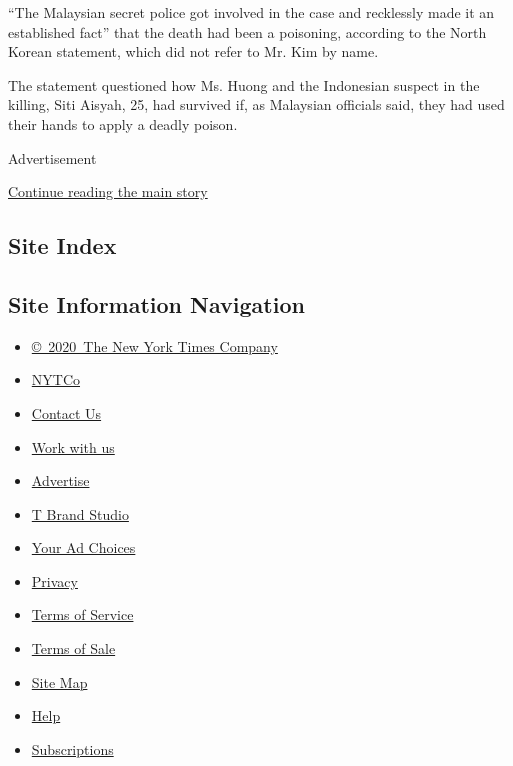 ``The Malaysian secret police got involved in the case and recklessly
made it an established fact'' that the death had been a poisoning,
according to the North Korean statement, which did not refer to Mr. Kim
by name.

The statement questioned how Ms. Huong and the Indonesian suspect in the
killing, Siti Aisyah, 25, had survived if, as Malaysian officials said,
they had used their hands to apply a deadly poison.

Advertisement

\protect\hyperlink{after-bottom}{Continue reading the main story}

\hypertarget{site-index}{%
\subsection{Site Index}\label{site-index}}

\hypertarget{site-information-navigation}{%
\subsection{Site Information
Navigation}\label{site-information-navigation}}

\begin{itemize}
\tightlist
\item
  \href{https://help.nytimes3xbfgragh.onion/hc/en-us/articles/115014792127-Copyright-notice}{©~2020~The
  New York Times Company}
\end{itemize}

\begin{itemize}
\tightlist
\item
  \href{https://www.nytco.com/}{NYTCo}
\item
  \href{https://help.nytimes3xbfgragh.onion/hc/en-us/articles/115015385887-Contact-Us}{Contact
  Us}
\item
  \href{https://www.nytco.com/careers/}{Work with us}
\item
  \href{https://nytmediakit.com/}{Advertise}
\item
  \href{http://www.tbrandstudio.com/}{T Brand Studio}
\item
  \href{https://www.nytimes3xbfgragh.onion/privacy/cookie-policy\#how-do-i-manage-trackers}{Your
  Ad Choices}
\item
  \href{https://www.nytimes3xbfgragh.onion/privacy}{Privacy}
\item
  \href{https://help.nytimes3xbfgragh.onion/hc/en-us/articles/115014893428-Terms-of-service}{Terms
  of Service}
\item
  \href{https://help.nytimes3xbfgragh.onion/hc/en-us/articles/115014893968-Terms-of-sale}{Terms
  of Sale}
\item
  \href{https://spiderbites.nytimes3xbfgragh.onion}{Site Map}
\item
  \href{https://help.nytimes3xbfgragh.onion/hc/en-us}{Help}
\item
  \href{https://www.nytimes3xbfgragh.onion/subscription?campaignId=37WXW}{Subscriptions}
\end{itemize}
